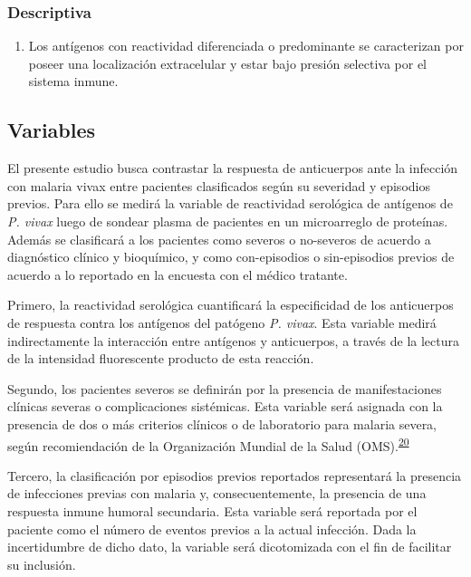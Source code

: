 \documentclass[]{article}
\providecommand{\tightlist}{%
  \setlength{\itemsep}{0pt}\setlength{\parskip}{0pt}}
\begin{document}
\subsubsection{Descriptiva}\label{descriptiva}

\begin{enumerate}
\def\labelenumi{\arabic{enumi}.}
\setcounter{enumi}{2}
\tightlist
\item
  Los antígenos con reactividad diferenciada o predominante se
  caracterizan por poseer una localización extracelular y estar bajo
  presión selectiva por el sistema inmune.
\end{enumerate}

\subsection{Variables}\label{variables}

El presente estudio busca contrastar la respuesta de anticuerpos ante la
infección con malaria vivax entre pacientes clasificados según su
severidad y episodios previos. Para ello se medirá la variable de
reactividad serológica de antígenos de \emph{P. vivax} luego de sondear
plasma de pacientes en un microarreglo de proteínas. Además se
clasificará a los pacientes como severos o no-severos de acuerdo a
diagnóstico clínico y bioquímico, y como con-episodios o sin-episodios
previos de acuerdo a lo reportado en la encuesta con el médico tratante.

Primero, la reactividad serológica cuantificará la especificidad de los
anticuerpos de respuesta contra los antígenos del patógeno \emph{P.
vivax}. Esta variable medirá indirectamente la interacción entre
antígenos y anticuerpos, a través de la lectura de la intensidad
fluorescente producto de esta reacción.

Segundo, los pacientes severos se definirán por la presencia de
manifestaciones clínicas severas o complicaciones sistémicas. Esta
variable será asignada con la presencia de dos o más criterios clínicos
o de laboratorio para malaria severa, según recomiendación de la
Organización Mundial de la Salud
(OMS).\textsuperscript{\protect\hyperlink{ref-WHO2014severe}{20}}

Tercero, la clasificación por episodios previos reportados representará
la presencia de infecciones previas con malaria y, consecuentemente, la
presencia de una respuesta inmune humoral secundaria. Esta variable será
reportada por el paciente como el número de eventos previos a la actual
infección. Dada la incertidumbre de dicho dato, la variable será
dicotomizada con el fin de facilitar su inclusión.
\end{document}
